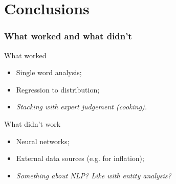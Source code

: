 \documentclass{beamer}
\begin{document}
\section{Conclusions}
\begin{frame}
\frametitle{What worked and what didn't}
 	  	\begin{exampleblock}{\begin{center}What worked\end{center}}
			\justifying
			\begin{itemize}
  				\item Single word analysis;
 				\item Regression to distribution;
  				\item \emph{Stacking with expert judgement (cooking).}
  			\end{itemize}
		\end{exampleblock}
		\begin{alertblock}{\begin{center}What didn't work\end{center}}
			\begin{itemize}
  				\item Neural networks;
 				\item External data sources (e.g. for inflation);
  				\item \emph{Something about NLP? Like with entity analysis?}
  			\end{itemize}
		\end{alertblock}
\end{frame}

\end{document}
